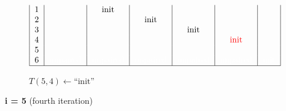 \begin{figure}[H]
\begin{subfigure}[t]{0.65\textwidth}
\[\begin{tabular}{|c|c|c|c|c|c|c|}
                                    1     &       & init  &       &       &                       &       \\
                                    2     &       &       & init  &       &                       &       \\
                                    3     &       &       &       & init  &                       &       \\
                                    4     &       &       &       &       & \textcolor{red}{init} &       \\
                                    5     &       &       &       &       &                       &       \\
                                    6 & \textcolor{white}{unpaired} & \textcolor{white}{unpaired} & \textcolor{white}{unpaired}
                                    & \textcolor{white}{unpaired}
                                    & \textcolor{white}{unpaired}
                                    & \textcolor{white}{init}
                                    \\ \hline
                        \end{tabular}
        \]
        \caption{$T(5,4) \gets \text{``init''}$ }
    \end{subfigure}
    \caption{\textbf{i = 5} (fourth iteration)}\label{fig:figure26}

\end{figure}



